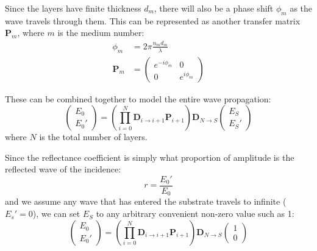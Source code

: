 \documentclass[a4paper]{scrartcl}
\begin{document}
Since the layers have finite thickness \(d_m\), there will also be a phase shift \(\phi_m\) as the wave travels through them. This can be represented as another transfer matrix \(\mathbf{P}_m\), where \(m\) is the medium number:
\begin{align*}
    \phi_m &= 2 \pi \frac{n_m d_m}{\lambda} \\
    \mathbf{P}_m &= \begin{pmatrix}
        e^{-i \phi_m} & 0 \\
        0 & e^{i \phi_m}
    \end{pmatrix}
\end{align*}

These can be combined together to model the entire wave propagation:
\[\begin{pmatrix}E_0 \\ E_0'\end{pmatrix} = \left(\prod_{i = 0}^N \mathbf{D}_{i \rightarrow i + 1} \mathbf{P}_{i + 1}\right) \mathbf{D}_{N \rightarrow S} \begin{pmatrix}E_S \\ E_S'\end{pmatrix}\]
where \(N\) is the total number of layers.

Since the reflectance coefficient is simply what proportion of amplitude is the reflected wave of the incidence:
\[r = \frac{E_0'}{E_0}\]
and we assume any wave that has entered the substrate travels to infinite (\(E_s' = 0\)), we can set \(E_S\) to any arbitrary convenient non-zero value such as 1:
\[\begin{pmatrix}E_0 \\ E_0'\end{pmatrix} = \left(\prod_{i = 0}^N \mathbf{D}_{i \rightarrow i + 1} \mathbf{P}_{i + 1}\right) \mathbf{D}_{N \rightarrow S} \begin{pmatrix}1 \\ 0\end{pmatrix}\]
\end{document}
